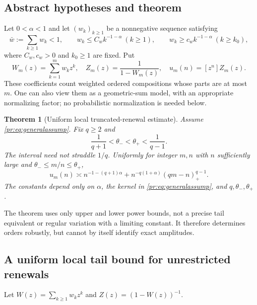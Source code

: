 \documentclass[11pt,a4paper]{article}
\newtheorem{theorem}{Theorem}[section]
\theoremstyle{definition}\newaliascnt{definition}{theorem}
\theoremstyle{remark}\newaliascnt{remark}{theorem}
\newcommand{\prcoef}[2]{[#1^{#2}]}
\newcommand{\prpos}[1]{(#1)_+}
\begin{document}
\subsection{Abstract hypotheses and theorem}
Let $0<\alpha<1$ and let $(w_k)_{k\ge1}$ be a nonnegative sequence
satisfying
\begin{equation}
 \bar w:=\sum_{k\ge1}w_k<1,\qquad
 w_k\le C_w k^{-1-\alpha}\ (k\ge1),\qquad
 w_k\ge c_w k^{-1-\alpha}\ (k\ge k_0),
 \label{pr:eq:generalassump}
\end{equation}
where $C_w,c_w>0$ and $k_0\ge1$ are fixed. Put
\begin{equation}
 W_m(z)=\sum_{k=1}^m w_kz^k,\quad
 Z_m(z)=\frac1{1-W_m(z)},\quad
 u_m(n)=\prcoef zn Z_m(z).
 \label{pr:eq:renewaldef}
\end{equation}
These coefficients count weighted ordered compositions whose parts are at
most $m$. One can also view them as a geometric-sum model, with an
appropriate normalizing factor; no probabilistic normalization is needed
below.

\begin{theorem}[Uniform local truncated-renewal estimate]\label{pr:thm:renewal}
Assume \eqref{pr:eq:generalassump}. Fix $q\ge2$ and
\begin{equation}
 \frac1{q+1}<\theta_-<\theta_+<\frac1{q-1}.
 \label{pr:eq:abrenewal}
\end{equation}
The interval need not straddle $1/q$. Uniformly for integer $m,n$ with $n$
sufficiently large and $\theta_-\le m/n\le\theta_+$,
\begin{equation}
 u_m(n)\asymp
 n^{-1-(q+1)\alpha}
 +n^{-q(1+\alpha)}\prpos{qm-n}^{q-1}.
 \label{pr:eq:renewalmain}
\end{equation}
The constants depend only on $\alpha$, the kernel in
\eqref{pr:eq:generalassump}, and $q,\theta_-,\theta_+$.
\end{theorem}

The theorem uses only upper and lower power bounds, not a precise tail
equivalent or regular variation with a limiting constant. It therefore
determines orders robustly, but cannot by itself identify exact amplitudes.

\subsection{A uniform local tail bound for unrestricted renewals}
Let $W(z)=\sum_{k\ge1}w_kz^k$ and $Z(z)=(1-W(z))^{-1}$.
\end{document}
